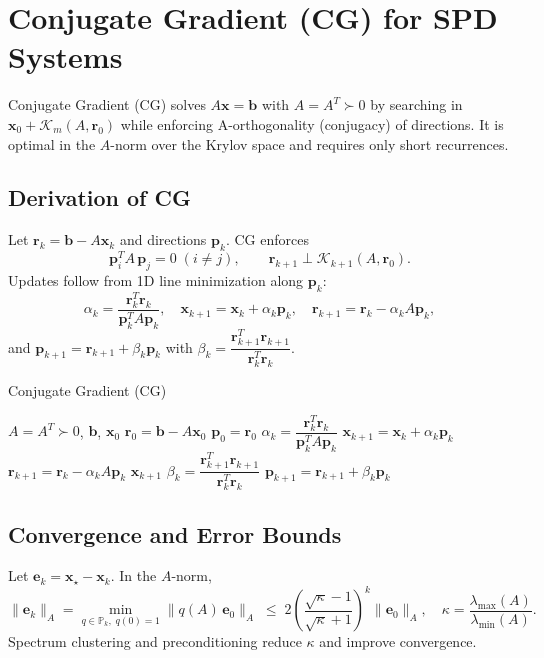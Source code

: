 \section{Conjugate Gradient (CG) for SPD Systems}

Conjugate Gradient (CG) solves $A\mathbf{x}=\mathbf{b}$ with $A=A^T\succ0$ by searching in $\mathbf{x}_0+\mathcal{K}_m(A,\mathbf{r}_0)$ while enforcing A-orthogonality (conjugacy) of directions.
It is optimal in the $A$-norm over the Krylov space and requires only short recurrences.

\subsection{Derivation of CG}
Let $\mathbf{r}_k=\mathbf{b}-A\mathbf{x}_k$ and directions $\mathbf{p}_k$. CG enforces
\[
  \mathbf{p}_i^T A\,\mathbf{p}_j=0\;(i\ne j),\qquad \mathbf{r}_{k+1}\perp \mathcal{K}_{k+1}(A,\mathbf{r}_0).
\]
Updates follow from 1D line minimization along $\mathbf{p}_k$:
\[
  \alpha_k=\frac{\mathbf{r}_k^T\mathbf{r}_k}{\mathbf{p}_k^T A\mathbf{p}_k},\quad \mathbf{x}_{k+1}=\mathbf{x}_k+\alpha_k\mathbf{p}_k,\quad \mathbf{r}_{k+1}=\mathbf{r}_k-\alpha_k A\mathbf{p}_k,
\]
and $\mathbf{p}_{k+1}=\mathbf{r}_{k+1}+\beta_k\mathbf{p}_k$ with $\beta_k=\dfrac{\mathbf{r}_{k+1}^T\mathbf{r}_{k+1}}{\mathbf{r}_k^T\mathbf{r}_k}$.

\begin{algorithm}[H]
  \caption{Conjugate Gradient (CG)}
  \label{alg:cg}
  \begin{algorithmic}[0]
    \Require $A=A^T\succ0$, $\mathbf{b}$, $\mathbf{x}_0$
    \State $\mathbf{r}_0=\mathbf{b}-A\mathbf{x}_0$
    \State $\mathbf{p}_0=\mathbf{r}_0$
    \State $\alpha_k=\dfrac{\mathbf{r}_k^T\mathbf{r}_k}{\mathbf{p}_k^T A\mathbf{p}_k}$
    \State $\mathbf{x}_{k+1}=\mathbf{x}_k+\alpha_k\mathbf{p}_k$
    \State $\mathbf{r}_{k+1}=\mathbf{r}_k-\alpha_k A\mathbf{p}_k$
     \Return $\mathbf{x}_{k+1}$ \EndIf
    \State $\beta_k=\dfrac{\mathbf{r}_{k+1}^T\mathbf{r}_{k+1}}{\mathbf{r}_k^T\mathbf{r}_k}$
    \State $\mathbf{p}_{k+1}=\mathbf{r}_{k+1}+\beta_k\mathbf{p}_k$
    \EndFor
  \end{algorithmic}
\end{algorithm}

\subsection{Convergence and Error Bounds}
Let $\mathbf{e}_k=\mathbf{x}_\star-\mathbf{x}_k$. In the $A$-norm,
\[
  \|\mathbf{e}_k\|_A=\min_{q\in\mathbb{P}_k,\;q(0)=1}\|q(A)\,\mathbf{e}_0\|_A\;\le\;2\left(\frac{\sqrt{\kappa}-1}{\sqrt{\kappa}+1}\right)^k\|\mathbf{e}_0\|_A,\quad \kappa=\frac{\lambda_{\max}(A)}{\lambda_{\min}(A)}.
\]
Spectrum clustering and preconditioning reduce $\kappa$ and improve convergence.

